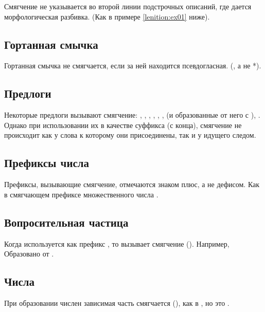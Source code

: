 \noindent Смягчение не указывается во второй линии подстрочных описаний, где дается морфологическая разбивка. (Как в примере \ref{lenition:ex01} ниже). 

\subsection{Гортанная смычка} Гортанная смычка не смягчается, если за ней находится псевдогласная. (, а не *).
\label{l-and-s:lenition:pseudovowel}

\subsection{Предлоги} Некоторые предлоги вызывают смягчение: , , , , , ,
 (и образованные от него  с ), . Однако при использовании их в качестве суффикса (с конца), смягчение не происходит как у слова к которому они присоединены, так и у идущего следом.

\subsection{Префиксы числа} Префиксы, вызывающие смягчение, отмечаются знаком плюс, а не дефисом. Как в смягчающем префиксе множественного числа . 

\subsection{Вопросительная частица} Когда используется как префикс , то вызывает смягчение (). Например,   Образовано от  .

\subsection{Числа}
При образовании числен зависимая часть смягчается
(), как в  ,
но  это .

